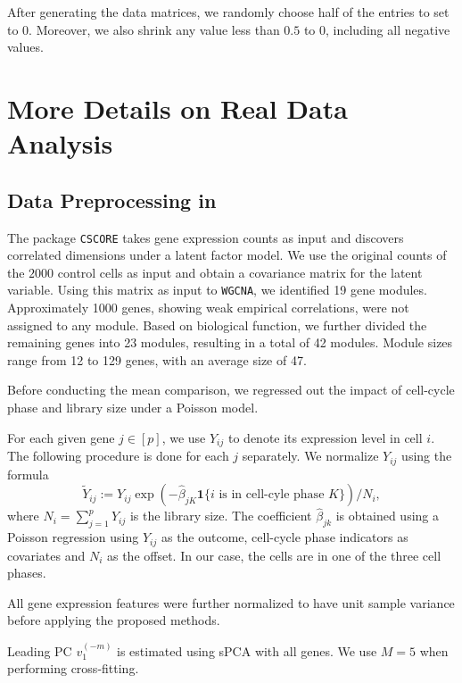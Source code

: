 \documentclass[11pt]{article}
\begin{document}
After generating the data matrices, we randomly choose half of the entries to set to $0$. Moreover, we also shrink any value less than $0.5$ to $0$, including all negative values. 


\section{More Details on Real Data Analysis}\label{app: immune cell results}

\subsection{Data Preprocessing in }\label{app: cleary_pre_processing}

The package \texttt{CSCORE} takes gene expression counts as input and discovers correlated dimensions under a latent factor model. We use the original counts of the $2000$ control cells as input and obtain a covariance matrix for the latent variable. Using this matrix as input to \texttt{WGCNA}, we identified 19 gene modules. Approximately 1000 genes, showing weak empirical correlations, were not assigned to any module. Based on biological function, we further divided the remaining genes into 23 modules, resulting in a total of 42 modules. Module sizes range from 12 to 129 genes, with an average size of 47.

Before conducting the mean comparison, we regressed out the impact of cell-cycle phase and library size under a Poisson model. 

For each given gene $j\in [p]$, we use $Y_{ij}$ to denote its expression level in cell $i$. The following procedure is done for each $j$ separately. We normalize $Y_{ij}$ using the formula
\begin{equation*}
    \tilde{Y}_{ij}:=Y_{ij} \exp \left(-\hat{\beta}_{jK} \mathbf{1}\{i \text { is in cell-cyle phase } K\}\right) / N_i,
\end{equation*}
where $N_i = \sum_{j=1}^p Y_{ij}$ is the library size. The coefficient $\hat \beta_{jk}$ is obtained using a Poisson regression using $Y_{ij}$ as the outcome, cell-cycle phase indicators as covariates and $N_i$ as the offset. In our case, the cells are in one of the three cell phases.

All gene expression features were further normalized to have unit sample variance before applying the proposed methods. 

Leading PC $v_1^{(-m)}$ is estimated using sPCA \cite{PMA} with all genes. We use $M=5$ when performing cross-fitting. 
\end{document}
